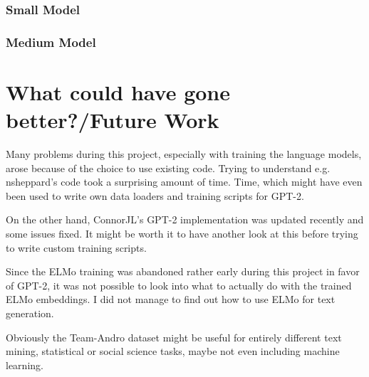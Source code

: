 \documentclass{scrartcl}
\begin{document}
\subsubsection*{Small Model}
\subsubsection*{Medium Model}


\section{What could have gone better?/Future Work}
\label{sec:FW}
Many problems during this project, especially with training the language models, arose because of the choice to use existing code. Trying to understand e.g. nsheppard's code took a surprising amount of time. Time, which might have even been used to write own data loaders and training scripts for GPT-2.

On the other hand, ConnorJL's GPT-2 implementation was updated recently and some issues fixed. It might be worth it to have another look at this before trying to write custom training scripts.

Since the ELMo training was abandoned rather early during this project in favor of GPT-2, it was not possible to look into what to actually do with the trained ELMo embeddings. I did not manage to find out how to use ELMo for text generation.

Obviously the Team-Andro dataset might be useful for entirely different text mining, statistical or social science tasks, maybe not even including machine learning.


 
%
%
%

\printbibliography
\end{document}
